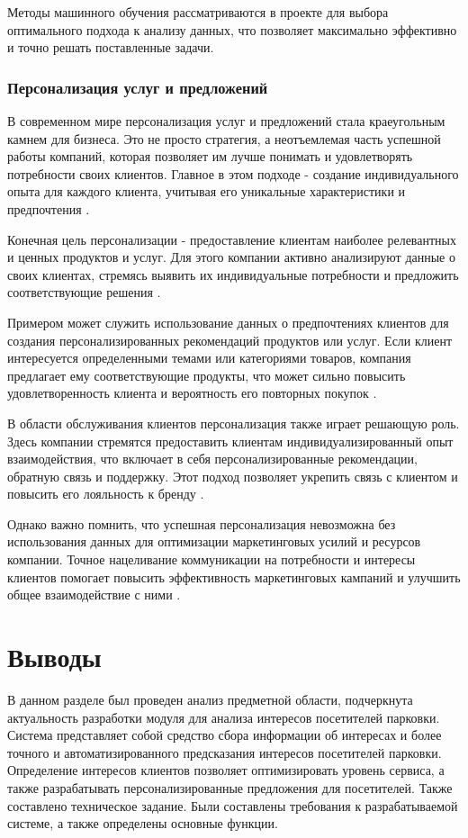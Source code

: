 Методы машинного обучения рассматриваются в проекте для выбора оптимального подхода к анализу данных, что позволяет максимально эффективно и точно решать поставленные задачи. 

\subsubsection{Персонализация услуг и предложений}

В современном мире персонализация услуг и предложений стала краеугольным камнем для бизнеса. Это не просто стратегия, а неотъемлемая часть успешной работы компаний, которая позволяет им лучше понимать и удовлетворять потребности своих клиентов. Главное в этом подходе - создание индивидуального опыта для каждого клиента, учитывая его уникальные характеристики и предпочтения .

Конечная цель персонализации - предоставление клиентам наиболее релевантных и ценных продуктов и услуг. Для этого компании активно анализируют данные о своих клиентах, стремясь выявить их индивидуальные потребности и предложить соответствующие решения .

Примером может служить использование данных о предпочтениях клиентов для создания персонализированных рекомендаций продуктов или услуг. Если клиент интересуется определенными темами или категориями товаров, компания предлагает ему соответствующие продукты, что может сильно повысить удовлетворенность клиента и вероятность его повторных покупок .

В области обслуживания клиентов персонализация также играет решающую роль. Здесь компании стремятся предоставить клиентам индивидуализированный опыт взаимодействия, что включает в себя персонализированные рекомендации, обратную связь и поддержку. Этот подход позволяет укрепить связь с клиентом и повысить его лояльность к бренду .

Однако важно помнить, что успешная персонализация невозможна без использования данных для оптимизации маркетинговых усилий и ресурсов компании. Точное нацеливание коммуникации на потребности и интересы клиентов помогает повысить эффективность маркетинговых кампаний и улучшить общее взаимодействие с ними .




\section*{Выводы}

В данном разделе был проведен анализ предметной области, подчеркнута актуальность разработки модуля для анализа интересов посетителей парковки. 
Система представляет собой средство сбора информации об интересах и более точного и автоматизированного предсказания интересов посетителей парковки. Определение интересов клиентов позволяет оптимизировать уровень сервиса, а также разрабатывать персонализированные предложения для посетителей.
Также составлено техническое задание. Были составлены требования к разрабатываемой системе, а также определены основные функции. 



